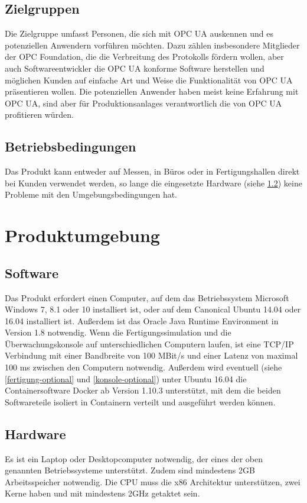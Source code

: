 \documentclass[parskip=full]{scrartcl}
\begin{document}
\subsection{Zielgruppen}
Die Zielgruppe umfasst Personen, die sich mit OPC UA auskennen und es potenziellen Anwendern vorführen möchten.
Dazu zählen insbesondere Mitglieder der OPC Foundation, die die Verbreitung des Protokolls fördern wollen,
aber auch Softwareentwickler die OPC UA konforme Software herstellen und möglichen Kunden auf einfache Art und
Weise die Funktionalität von OPC UA präsentieren wollen.
Die potenziellen Anwender haben meist keine Erfahrung mit OPC UA, sind aber für \glspl{Produktionsanlage} verantwortlich
die von OPC UA profitieren würden.

\subsection{Betriebsbedingungen}
Das Produkt kann entweder auf Messen, in Büros oder in Fertigungshallen direkt bei Kunden verwendet werden,
so lange die eingesetzte Hardware (siehe \ref{Hardware}) keine Probleme mit den Umgebungsbedingungen hat.

\section{Produktumgebung}
\subsection{Software}
Das Produkt erfordert einen Computer, auf dem das Betriebssystem Microsoft Windows 7, 8.1 oder 10 installiert ist,
oder auf dem Canonical Ubuntu 14.04 oder 16.04 installiert ist. Außerdem ist das Oracle Java Runtime Environment in Version 1.8
notwendig. Wenn die Fertigungssimulation und die Überwachungskonsole auf unterschiedlichen Computern laufen,
ist eine TCP/IP Verbindung mit einer Bandbreite von 100 MBit/s und einer Latenz von maximal 100 ms zwischen den Computern notwendig.
Außerdem wird eventuell (siehe \ref{fertigung-optional} und \ref{konsole-optional}) unter Ubuntu 16.04 die Containersoftware Docker
ab Version 1.10.3 unterstützt, mit dem die beiden Softwareteile isoliert in Containern verteilt und ausgeführt werden können.

\subsection{Hardware}
\label{Hardware}
Es ist ein Laptop oder Desktopcomputer notwendig, der eines der oben genannten Betriebssysteme unterstützt.
Zudem sind mindestens 2GB Arbeitsspeicher notwendig. Die CPU muss die x86 Architektur unterstützen, zwei Kerne haben und mit
mindestens 2GHz getaktet sein.
\end{document}
